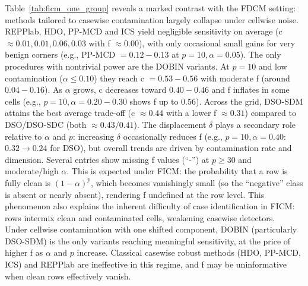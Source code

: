 \documentclass[12pt]{article}
\begin{document}
Table~\ref{tab:ficm_one_group} reveals a marked contrast with the FDCM setting: methods tailored to casewise contamination largely collapse under cellwise noise. 
REPPlab, HDO, PP-MCD and ICS yield negligible sensitivity on average (c \(\approx 0.01,0.01,0.06,0.03\) with f \(\approx 0.00\)), with only occasional small gains for very benign corners (e.g., PP-MCD \(=0.12{-}0.13\) at \(p=10,\alpha=0.05\)). The only procedures with nontrivial power are the DOBIN variants. 
At \(p=10\) and low contamination (\(\alpha\le 0.10\)) they reach c \(=0.53{-}0.56\) with moderate f (around \(0.04{-}0.16\)). As \(\alpha\) grows, c decreases toward \(0.40{-}0.46\) and f inflates in some cells (e.g., \(p=10,\alpha=0.20{-}0.30\) shows f up to \(0.56\)). 
Across the grid, DSO-SDM attains the best average trade-off (c \(\approx 0.44\) with a lower f \(\approx 0.31\)) compared to DSO/DSO-SDC (both \(\approx 0.43/0.41\)). The displacement \(\delta\) plays a secondary role relative to \(\alpha\) and \(p\): increasing \(\delta\) occasionally reduces f (e.g., \(p=10,\alpha=0.40\): \(0.32\to0.24\) for DSO), but overall trends are driven by contamination rate and dimension. Several entries show missing f values (“-”) at \(p\ge 30\) and moderate/high \(\alpha\). This is expected under FICM: the probability that a row is fully clean is \((1-\alpha)^p\), which becomes vanishingly small (so the “negative” class is absent or nearly absent), rendering f undefined at the row level.  This phenomenon also explains the inherent difficulty of case identification in FICM: rows intermix clean and contaminated cells, weakening casewise detectors.\\

Under cellwise contamination with one shifted component, DOBIN (particularly DSO-SDM) is the only variants reaching meaningful sensitivity, at the price of higher f as \(\alpha\) and \(p\) increase. Classical casewise robust methods (HDO, PP-MCD, ICS) and REPPlab are ineffective in this regime, and f may be uninformative when clean rows effectively vanish.
\end{document}

